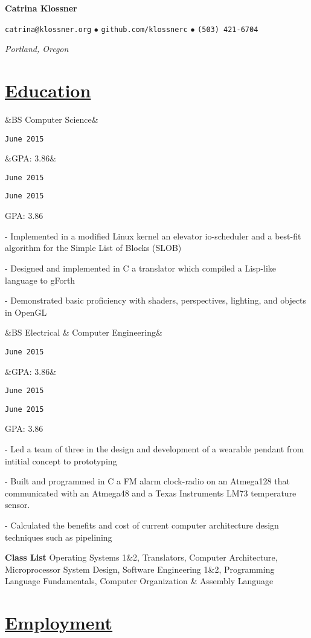 \documentclass[11pt]{article}
\newcommand{\heading}[1]{
    \section*{\uline{\hfill #1}}
}
\newcommand{\squish}{
    \setlength{\itemsep}{0.5pt}
    \setlength{\parskip}{0pt}
    \setlength{\parsep}{0.5pt}
}
\newcommand{\when}[1]{
    \hfill \texttt{#1}
}
\newcommand{\experience}[4]{
    \ifx&#2&
        \item[{#1}]
        \when{#4}
    \else
        \ifx&#3&
            \item[{#1}, \emph{#2}]
            \when{#4}
        \else
            \item[{#1}, \emph{#2}]
            \when{#4}
            \item{#3}
            \when{}
        \fi
    \fi
}
\newcommand{\contact}[4]{
    \centerline{
        \large       
        \texttt{#1}
        $\bullet$
        \texttt{#2}
        $\bullet$
        \texttt{#3}
    }
    \centerline{
        \emph{#4}
    }
}
\newcommand{\skill}[2]{
    \textbf{#1} \hfill #2
}
\newcommand{\CPP}{
    C\hspace{-.05em}\raisebox{.4ex}{\tiny\bf +}\hspace{-.10em}\raisebox{.4ex}{\tiny\bf +}
}
\begin{document}
\centerline{{\Huge \bf Catrina Klossner}}
\bigskip

\contact{catrina@klossner.org}
        {github.com/klossnerc}
        {(503) 421-6704}
        {Portland, Oregon}

%
%
%
%

\heading{Education}%

\begin{description}
\squish   
\experience{Oregon State University}
           {BS Computer Science}
           {GPA: 3.86}
           {June 2015}

	- Implemented in a modified Linux kernel an elevator io-scheduler and a best-fit algorithm for the Simple List of Blocks (SLOB) 

	- Designed and implemented in C a translator which compiled a Lisp-like language to gForth 

	- Demonstrated basic proficiency with shaders, perspectives, lighting, and objects in OpenGL 


\experience{Oregon State University}
           {BS Electrical \& Computer Engineering}
           {GPA: 3.86}
           {June 2015}

	- Led a team of three in the design and development of a wearable pendant from intitial concept to prototyping 

	- Built and programmed in C a FM alarm clock-radio on an Atmega128 that communicated with an Atmega48 and a Texas Instruments LM73 temperature sensor.

	- Calculated the benefits and cost of current computer architecture design techniques such as pipelining 

\end{description}

\skill{Class List}{Operating Systems 1\&2, Translators, Computer Architecture, Microprocessor System Design, Software Engineering 1\&2, Programming Language Fundamentals, Computer Organization \& Assembly Language}


\heading{Employment}%
\end{document}
